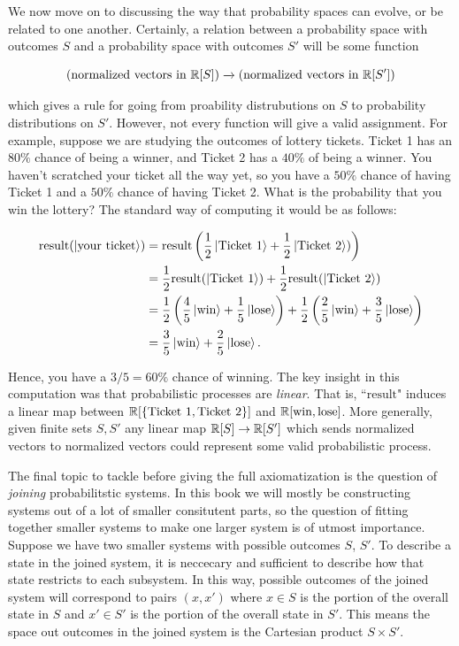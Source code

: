 \documentclass{article}
\theoremstyle{definition}
\numberwithin{figure}{section}
\begin{document}
We now move on to discussing the way that probability spaces can evolve, or be related to one another. Certainly, a relation between a probability space with outcomes $S$ and a probability space with outcomes $S'$ will be some function

$$\left(\text{normalized vectors in }\mathbb{R}[S]\right)\xrightarrow{}\left(\text{normalized vectors in }\mathbb{R}[S']\right)$$

which gives a rule for going from proability distrubutions on $S$ to probability distributions on $S'$. However, not every function will give a valid assignment. For example, suppose we are studying the outcomes of lottery tickets. Ticket 1 has an $80\%$ chance of being a winner, and Ticket 2 has a $40\%$ of being a winner. You haven't scratched your ticket all the way yet, so you have a $50\%$ chance of having Ticket 1 and a $50\%$ chance of having Ticket 2. What is the probability that you win the lottery? The standard way of computing it would be as follows:

\begin{align*}
\text{result}(\ket{\text{your ticket}})&=\text{result}\left(\frac{1}{2}\ket{\text{Ticket 1}}+\frac{1}{2}\ket{\text{Ticket 2}})\right)\\
&=\frac{1}{2}\text{result}(\ket{\text{Ticket 1}})+\frac{1}{2}\text{result}(\ket{\text{Ticket 2}})\\
&=\frac{1}{2}\left(\frac{4}{5}\ket{\text{win}}+\frac{1}{5}\ket{\text{lose}}\right)+\frac{1}{2}\left(\frac{2}{5}\ket{\text{win}}+\frac{3}{5}\ket{\text{lose}}\right)\\
&=\frac{3}{5}\ket{\text{win}}+\frac{2}{5}\ket{\text{lose}}.
\end{align*}

Hence, you have a $3/5=60\%$ chance of winning. The key insight in this computation was that probabilistic processes are \textit{linear}. That is, ``$\text{result}$" induces a linear map between $\mathbb{R}[\{\text{Ticket 1}, \text{Ticket 2}\}]$ and $\mathbb{R}[\text{win},\text{lose}]$. More generally, given finite sets $S,S'$ any linear map $\mathbb{R}[S]\to\mathbb{R}[S']$ which sends normalized vectors to normalized vectors could represent some valid probabilistic process.

The final topic to tackle before giving the full axiomatization is the question of \textit{joining} probabilitstic systems. In this book we will mostly be constructing systems out of a lot of smaller consitutent parts, so the question of fitting together smaller systems to make one larger system is of utmost importance. Suppose we have two smaller systems with possible outcomes $S$, $S'$. To describe a state in the joined system, it is neccecary and sufficient to describe how that state restricts to each subsystem. In this way, possible outcomes of the joined system will correspond to pairs $(x,x')$ where $x\in S$ is the portion of the overall state in $S$ and $x'\in S'$ is the portion of the overall state in $S'$. This means the space out outcomes in the joined system is the Cartesian product $S\times S'$.
\end{document}
